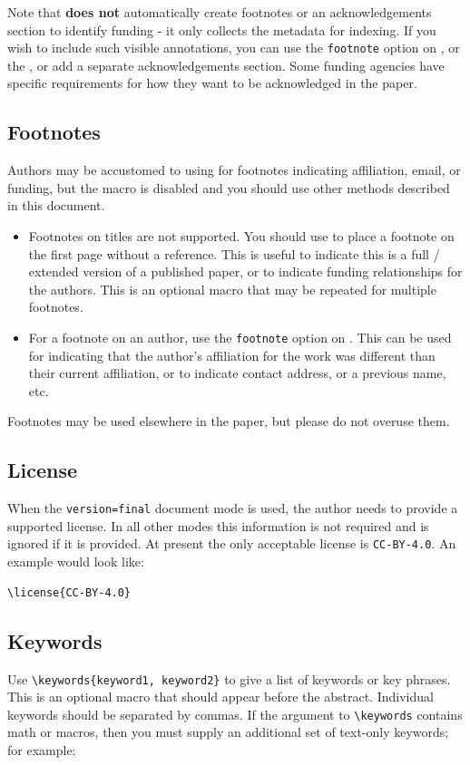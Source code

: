\documentclass[journal=cic,version=preprint]{iacrj}
\begin{document}
Note that  \textbf{does not} automatically create footnotes or
an acknowledgements section to identify funding - it only collects the
metadata for indexing. If you wish to include such visible
annotations, you can use the \texttt{footnote} option on
, or the , or add a separate
acknowledgements section. Some funding agencies have specific
requirements for how they want to be acknowledged in the paper.

\subsection{Footnotes}\label{footnotes}
Authors may be accustomed to using  for footnotes
indicating affiliation, email, or funding, but the
 macro is disabled and you should use other methods described
in this document.
\begin{itemize}
\item Footnotes on titles are not supported. You should use 
   to place a
  footnote on the first page without a reference. This is useful to
  indicate this is a full / extended version of a published paper, or to
  indicate funding relationships for the authors.  This is an optional
  macro that may be repeated for multiple footnotes.
\item For a footnote on an author, use the \texttt{footnote} option
  on . This can be used for indicating that the author's
  affiliation for the work was different than their current affiliation,
  or to indicate contact address, or a previous name, etc.
\end{itemize}

Footnotes may be used elsewhere in the paper, but please do not
overuse them.

\subsection{License}
When the \texttt{version=final} document mode is used, the author needs
to provide a supported license.  In all other modes this information
is not required and is ignored if it is provided.  At present the only
acceptable license is \texttt{CC-BY-4.0}.  An example would look like:

\begin{verbatim}
\license{CC-BY-4.0}
\end{verbatim}

\subsection{Keywords}
Use \texttt{\textbackslash keywords\{keyword1, keyword2\}} to give a
list of keywords or key phrases. This is an optional macro that should
appear before the abstract.  Individual keywords should be separated
by commas. If the argument to \texttt{\textbackslash keywords}
contains math or macros, then you must supply an additional set of
text-only keywords; for example:
\end{document}
